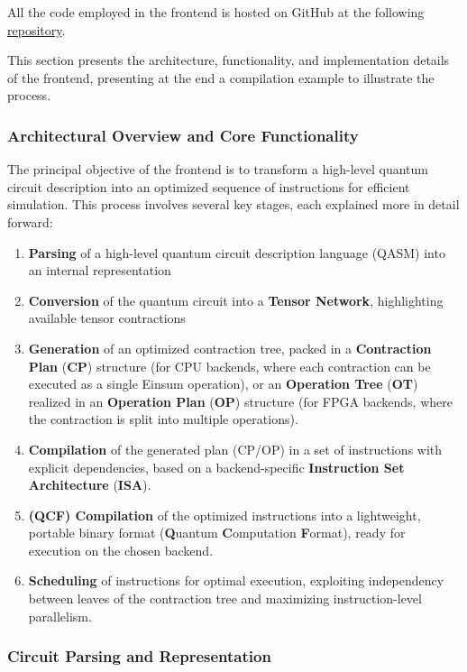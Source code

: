 \documentclass[12pt,oneside,a4paper]{article}
\begin{document}
All the code employed in the frontend is hosted on GitHub at the following \href{https://github.com/federico123579/HPPS24-Quantum-Simulation}{repository}.

This section presents the architecture, functionality, and implementation details of the frontend, presenting at the end a compilation example to illustrate the process.

\subsubsection{Architectural Overview and Core Functionality}

The principal objective of the frontend is to transform a high-level quantum circuit description into an optimized sequence of instructions for efficient simulation. This process involves several key stages, each explained more in detail forward:

\begin{enumerate}
    \item \textbf{Parsing} of a high-level quantum circuit description language (QASM) into an internal representation
    \item \textbf{Conversion} of the quantum circuit into a \textbf{Tensor Network}, highlighting available tensor contractions
    \item \textbf{Generation} of an optimized contraction tree, packed in a \textbf{Contraction Plan} (\textbf{CP}) structure (for CPU backends, where each contraction can be executed as a single Einsum operation), or an \textbf{Operation Tree} (\textbf{OT}) realized in an \textbf{Operation Plan} (\textbf{OP}) structure (for FPGA backends, where the contraction is split into multiple operations).
    \item \textbf{Compilation} of the generated plan (CP/OP) in a set of instructions with explicit dependencies, based on a backend-specific \textbf{Instruction Set Architecture} (\textbf{ISA}).
    \item \textbf{(QCF) Compilation} of the optimized instructions into a lightweight, portable binary format (\textbf{Q}uantum \textbf{C}omputation \textbf{F}ormat), ready for execution on the chosen backend.
    \item \textbf{Scheduling} of instructions for optimal execution, exploiting independency between leaves of the contraction tree and maximizing instruction-level parallelism.
\end{enumerate}

\subsubsection{Circuit Parsing and Representation}
\end{document}
